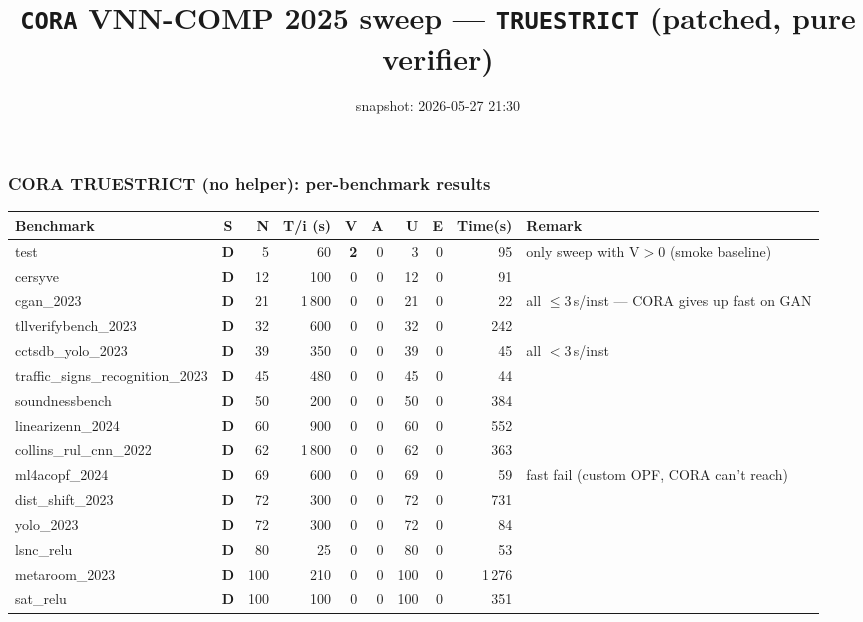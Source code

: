 \documentclass[10pt]{beamer}
\title{\large \texttt{CORA} VNN-COMP 2025 sweep — \texttt{TRUESTRICT} (patched, pure verifier)}
\date{snapshot: 2026-05-27 21:30}
\newcommand{\sdone}{{\color{cdone}\textbf{D}}}
\begin{document}
\begin{frame}[fragile]
\frametitle{CORA TRUESTRICT (no helper): per-benchmark results}

\centering\tiny
\setlength{\tabcolsep}{3pt}
\begin{tabular}{l c r r r r r r r l}
\toprule
\textbf{Benchmark} & \textbf{S} & \textbf{N} & \textbf{T/i (s)} & \textbf{V} & \textbf{A} & \textbf{U} & \textbf{E} & \textbf{Time(s)} & \textbf{Remark} \\
\midrule
test                            & \sdone  & 5    & 60   & \textbf{2} & 0 & 3   & 0 & 95     & only sweep with V$>$0 (smoke baseline) \\
cersyve                         & \sdone  & 12   & 100  & 0    & 0   & 12  & 0   & 91      & \\
cgan\_2023                      & \sdone  & 21   & 1\,800 & 0  & 0   & 21  & 0   & 22      & all $\le$3\,s/inst — CORA gives up fast on GAN \\
tllverifybench\_2023            & \sdone  & 32   & 600  & 0    & 0   & 32  & 0   & 242     & \\
cctsdb\_yolo\_2023              & \sdone  & 39   & 350  & 0    & 0   & 39  & 0   & 45      & all $<$3\,s/inst \\
traffic\_signs\_recognition\_2023 & \sdone & 45 & 480  & 0    & 0   & 45  & 0   & 44      & \\
soundnessbench                  & \sdone  & 50   & 200  & 0    & 0   & 50  & 0   & 384     & \\
linearizenn\_2024               & \sdone  & 60   & 900  & 0    & 0   & 60  & 0   & 552     & \\
collins\_rul\_cnn\_2022         & \sdone  & 62   & 1\,800 & 0  & 0   & 62  & 0   & 363     & \\
ml4acopf\_2024                  & \sdone  & 69   & 600  & 0    & 0   & 69  & 0   & 59      & fast fail (custom OPF, CORA can't reach) \\
dist\_shift\_2023               & \sdone  & 72   & 300  & 0    & 0   & 72  & 0   & 731     & \\
yolo\_2023                      & \sdone  & 72   & 300  & 0    & 0   & 72  & 0   & 84      & \\
lsnc\_relu                      & \sdone  & 80   & 25   & 0    & 0   & 80  & 0   & 53      & \\
metaroom\_2023                  & \sdone  & 100  & 210  & 0    & 0   & 100 & 0   & 1\,276  & \\
sat\_relu                       & \sdone  & 100  & 100  & 0    & 0   & 100 & 0   & 351     & \\

\end{tabular}
\end{frame}
\end{document}
